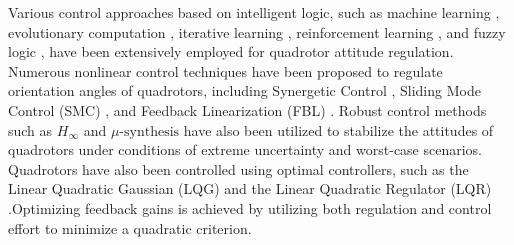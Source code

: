 \documentclass[3p,times]{elsarticle}
\begin{document}
Various control approaches based on intelligent logic, such as machine learning \cite{4564736}, evolutionary computation \cite{doi:10.2514/6.2013-5098}, iterative learning \cite{electronics10202474}, reinforcement learning \cite{app11073257}, and fuzzy logic \cite{9782598}, have been extensively employed for quadrotor attitude regulation.
Numerous nonlinear control techniques have been proposed to regulate orientation angles of quadrotors, 
including
Synergetic Control \cite{article_Chara}, 
Sliding Mode Control (SMC) \cite{7007285},
and Feedback Linearization (FBL) \cite{article_Aboudonia}.
Robust control methods such as $H_{\infty}$ \cite{9283788, inproceedings_Hamza} and $\mu\text{-synthesis}$ \cite{inbook_Dean} have also been utilized to stabilize the attitudes of quadrotors under conditions of extreme uncertainty and worst-case scenarios.
Quadrotors have also been controlled using optimal controllers, such as the Linear Quadratic Gaussian (LQG) \cite{7367782} and the Linear Quadratic Regulator (LQR) \cite{7064553_LQR}.Optimizing feedback gains is achieved by utilizing both regulation and control effort to minimize a quadratic criterion.
\end{document}
